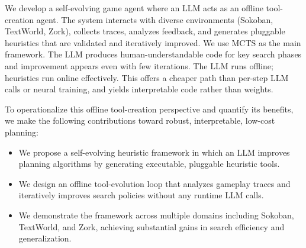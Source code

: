 \documentclass{article}
\begin{document}
We develop a self-evolving game agent where an LLM acts as an offline tool-creation agent. The system interacts with diverse environments (Sokoban, TextWorld, Zork), collects traces, analyzes feedback, and generates pluggable heuristics that are validated and iteratively improved. We use MCTS as the main framework. The LLM produces human-understandable code for key search phases and improvement appears even with few iterations. The LLM runs offline; heuristics run online effectively. This offers a cheaper path than per-step LLM calls or neural training, and yields interpretable code rather than weights.

To operationalize this offline tool-creation perspective and quantify its benefits, we make the following contributions toward robust, interpretable, low-cost planning:
\begin{itemize}
    \item We propose a self-evolving heuristic framework in which an LLM improves planning algorithms by generating executable, pluggable heuristic tools.
    \item We design an offline tool-evolution loop that analyzes gameplay traces and iteratively improves search policies without any runtime LLM calls.
    \item We demonstrate the framework across multiple domains including Sokoban, TextWorld, and Zork, achieving substantial gains in search efficiency and generalization.
\end{itemize}

\end{document}
